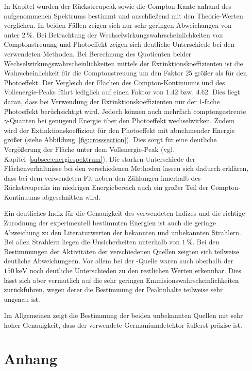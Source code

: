 In Kapitel \label{subsubsec:P} wurden der Rückstreupeak sowie die Compton-Kante
anhand des aufgenommenen Spektrums bestimmt und anschließend mit den Theorie-Werten
verglichen. In beiden Fällen zeigen sich nur sehr geringen Abweichungen von
unter $\SI{2}{\percent}$.
Bei Betrachtung der Wechselwirkungswahrscheinlichkeiten von Comptonstreuung und
Photoeffekt zeigen sich deutliche Unterschiede
bei den verwendeten Methoden. Bei Berechnung des Quotienten beider
Wechselwirkungswahrscheinlichkeiten mittels der Extinktionskoeffizienten
ist die Wahrscheinlichkeit für die Comptonstreuung um den Faktor 25 größer als
für den Photoeffekt. Der Vergleich der Flächen des Compton-Kontinuums und des
Vollenergie-Peaks führt lediglich auf einen Faktor von $\num{1.42}$
bzw. $\num{4.62}$. Dies liegt daran, dass bei Verwendung der Extinktionskoeffizienten
nur der 1-fache Photoeffekt berüchsichtigt wird. Jedoch können auch mehrfach
comptongestreute $\gamma$-Quanten bei genügend Energie über den Photoeffekt wechselwirken.
Zudem wird der Extinktionskoeffizient für den Photoeffekt mit abnehmender Energie
größer (siehe Abbildung~\ref{fig:crosssection}). Dies sorgt für eine deutliche
Vergößerung der Fläche unter dem Vollenergie-Peak (vgl. Kapitel~\ref{subsec:energiespektrum}).
Die starken Unterschiede der Flächenverhältnisse bei den verschiedenen Methoden
lassen sich dadurch erklären, dass bei dem verwendeten Fit neben den Zählungen
innerhalb des Rückstreupeaks im niedrigen Energiebereich auch ein großer
Teil der Compton-Kontinuums abgeschnitten wird.

Ein deutliches Indiz für die Genauigkeit des verwendeten Indizes und die richtige
Zurodnung der experimentell bestimmten Energien ist auch die
geringe Abweichung zu den Literaturwerten der bekannten und
unbekannten Strahlern. Bei allen Strahlern liegen die Unsicherheiten unterhalb
von $\SI{1}{\percent}$. Bei den Bestimmungen der Aktivitäten der verschiedenen
Quellen zeigten sich teilweise deutliche Abweichungeen. Vor allem bei der
-Quelle waren auch oberhalb der $\SI{150}{\kilo\eV}$ noch deutliche
Unterschieden zu den restlichen Werten erkennbar. Dies lässt sich aber vermutlich
auf die sehr geringen Emmisionswahrscheinlichkeiten zurückführen, wegen derer die
Bestimmung der Peakinhalte teilweise sehr ungenau ist.

Im Allgemeinen zeigt die Bestimmung der beiden unbekannten Quellen mit sehr hoher
Genauigkeit, dass der verwendete Germaniumdetektor äußerst präzise ist.

\newpage
\section{Anhang}

